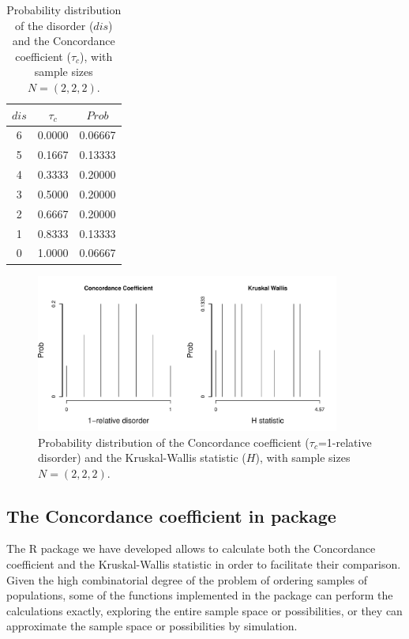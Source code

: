 \begin{table}[h] 	\centering\footnotesize
\begin{tabular}{ccc} 
    $dis$ & $\tau_c$   &$ Prob$           \\ \toprule
6	&	0.0000	&	0.06667\\ \cmidrule(l){1-3}
5	&	0.1667	&	0.13333	\\ \cmidrule(l){1-3}
4	&	0.3333	&	0.20000 	\\ \cmidrule(l){1-3}
3	&	0.5000	&	0.20000\\ \cmidrule(l){1-3}
2	&	0.6667	&	0.20000	\\ \cmidrule(l){1-3}
1	&	0.8333	&	0.13333	\\ \cmidrule(l){1-3}
0	&	1.0000	&	0.06667	\\ \bottomrule[0.2mm]
\end{tabular}
\caption{Probability distribution of the disorder ($dis$) and the Concordance coefficient ($\tau_c$), with sample sizes $N = (2,2,2)$.}
\label{t:prob_DK_222}
\end{table}

\begin{figure}[h]
\centering
\includegraphics[width=10cm]{CC_H_222.pdf}
\caption{\label{fig:distprob_222} Probability distribution of the Concordance coefficient ($\tau_c$=1-relative disorder) and the Kruskal-Wallis statistic ($H$), with sample sizes $N = (2,2,2)$.}
\end{figure}

\subsection{The Concordance coefficient in  package}

The R package we have developed allows to calculate both the Concordance coefficient and the Kruskal-Wallis statistic in order to facilitate their comparison. Given the high combinatorial degree of the problem of ordering samples of populations, some of the functions implemented in the package can perform the calculations exactly, exploring the entire sample space or possibilities, or they can approximate the sample space or possibilities by simulation.

